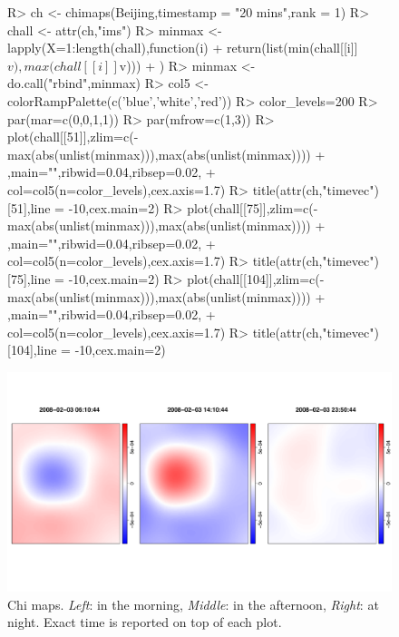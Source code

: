 \documentclass[article]{jss}
\begin{document}
\begin{figure}[!h]
\begin{center}
\begin{Sinput}
R>  ch <- chimaps(Beijing,timestamp = "20 mins",rank = 1)
R>  chall <- attr(ch,"ims")
R>  minmax <- lapply(X=1:length(chall),function(i){
+       return(list(min(chall[[i]]$v),max(chall[[i]]$v)))
+     })
R>  minmax <- do.call("rbind",minmax)
R>  col5 <- colorRampPalette(c('blue','white','red'))
R>  color_levels=200
R>  par(mar=c(0,0,1,1))
R>  par(mfrow=c(1,3))
R>  plot(chall[[51]],zlim=c(-max(abs(unlist(minmax))),max(abs(unlist(minmax))))
+        ,main="",ribwid=0.04,ribsep=0.02,
+        col=col5(n=color_levels),cex.axis=1.7)
R>  title(attr(ch,"timevec")[51],line = -10,cex.main=2)
R>  plot(chall[[75]],zlim=c(-max(abs(unlist(minmax))),max(abs(unlist(minmax))))
+        ,main="",ribwid=0.04,ribsep=0.02,
+        col=col5(n=color_levels),cex.axis=1.7)
R>  title(attr(ch,"timevec")[75],line = -10,cex.main=2)
R>  plot(chall[[104]],zlim=c(-max(abs(unlist(minmax))),max(abs(unlist(minmax))))
+        ,main="",ribwid=0.04,ribsep=0.02,
+        col=col5(n=color_levels),cex.axis=1.7)
R>  title(attr(ch,"timevec")[104],line = -10,cex.main=2)
\end{Sinput}
\includegraphics{article-020}
\end{center}
\caption{Chi maps. \emph{Left}: in the morning, \emph{Middle}: in the afternoon, \emph{Right}: at night.  Exact time is reported on top of each plot.}
\label{bijingchi}
\end{figure}

\end{document}
